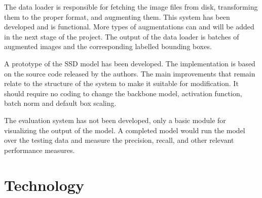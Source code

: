 The data loader is responsible for fetching the image files from disk, transforming them to the proper format, and augmenting them.
This system has been developed and is functional.
More types of augmentations can and will be added in the next stage of the project.
The output of the data loader is batches of augmented images and the corresponding labelled bounding boxes.

A prototype of the SSD model has been developed.
The implementation is based on the source code released by the authors.
The main improvements that remain relate to the structure of the system to make it suitable for modification.
It should require no coding to change the backbone model, activation function, batch norm and default box scaling.

The evaluation system has not been developed, only a basic module for visualizing the output of the model.
A completed model would run the model over the testing data and measure the precision, recall, and other relevant performance measures.


\section*{Technology}

